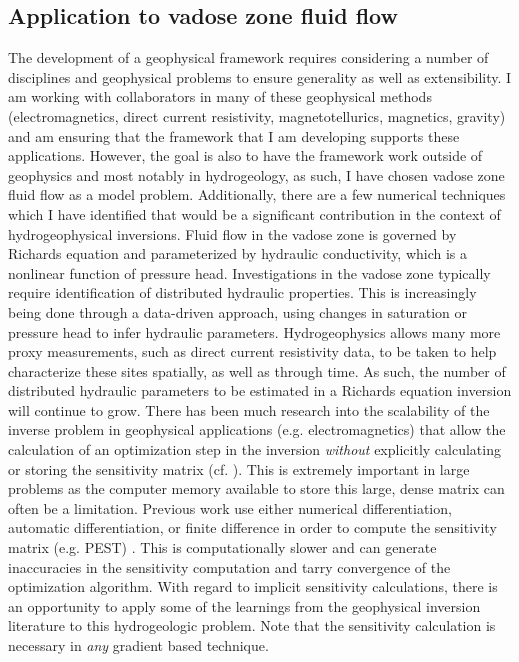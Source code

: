 \documentclass[11pt]{article}
\begin{document}
\subsection{Application to vadose zone fluid flow}

The development of a geophysical framework requires considering a number of disciplines and geophysical problems to ensure generality as well as extensibility. I am working with collaborators in many of these geophysical methods (electromagnetics, direct current resistivity, magnetotellurics, magnetics, gravity) and am ensuring that the framework that I am developing supports these applications. However, the goal is also to have the framework work outside of geophysics and most notably in hydrogeology, as such, I have chosen vadose zone fluid flow as a model problem. Additionally, there are a few numerical techniques which I have identified that would be a significant contribution in the context of hydrogeophysical inversions. Fluid flow in the vadose zone is governed by Richards equation and parameterized by hydraulic conductivity, which is a nonlinear function of pressure head. Investigations in the vadose zone typically require identification of distributed hydraulic properties. This is increasingly being done through a data-driven approach, using changes in saturation or pressure head to infer hydraulic parameters. Hydrogeophysics allows many more proxy measurements, such as direct current resistivity data, to be taken to help characterize these sites spatially, as well as through time. As such, the number of distributed hydraulic parameters to be estimated in a Richards equation inversion will continue to grow. There has been much research into the scalability of the inverse problem in geophysical applications (e.g. electromagnetics) that allow the calculation of an optimization step in the inversion \emph{without} explicitly calculating or storing the sensitivity matrix (cf. \cite{hao}). This is extremely important in large problems as the computer memory available to store this large, dense matrix can often be a limitation. Previous work use either numerical differentiation, automatic differentiation, or finite difference in order to compute the sensitivity matrix (e.g. PEST) \citep{Finsterle2011c, Bitterlich2002}. This is computationally slower and can generate inaccuracies in the sensitivity computation and tarry convergence of the optimization algorithm. With regard to implicit sensitivity calculations, there is an opportunity to apply some of the learnings from the geophysical inversion literature to this hydrogeologic problem. Note that the sensitivity calculation is necessary in \emph{any} gradient based technique.
\end{document}
